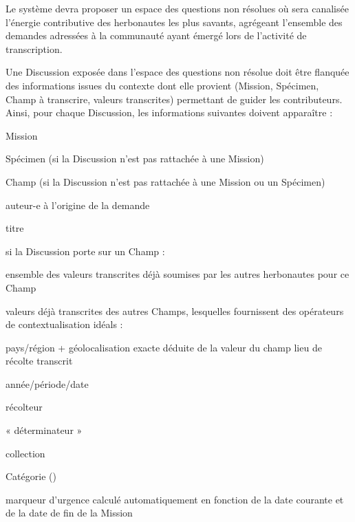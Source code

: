 Le système devra proposer un espace des questions non résolues où sera canalisée l'énergie contributive des herbonautes les plus savants, agrégeant l'ensemble des demandes adressées à la communauté ayant émergé lors de l'activité de transcription.

\startsubsection[title={Contextualisation des Discussions}]

Une Discussion exposée dans l'espace des questions non résolue doit être flanquée des informations issues du contexte dont elle provient (Mission, Spécimen, Champ à transcrire, valeurs transcrites) permettant de guider les contributeurs.
Ainsi, pour chaque Discussion, les informations suivantes doivent apparaître :

\startitemize
\item Mission
\item Spécimen (si la Discussion n'est pas rattachée à une Mission)
\item Champ (si la Discussion n'est pas rattachée à une Mission ou un Spécimen)
\item auteur-e à l'origine de la demande
\item titre
\item si la Discussion porte sur un Champ :
    \startitemize
    \item ensemble des valeurs transcrites déjà soumises par les autres herbonautes pour ce Champ
    \item valeurs déjà transcrites des autres Champs, lesquelles fournissent des opérateurs de contextualisation idéals :
        \startitemize
        \item pays/région + géolocalisation exacte déduite de la valeur du champ lieu de récolte transcrit
        \item année/période/date
        \item récolteur
        \item « déterminateur »
        \item collection
        \stopitemize
    \stopitemize
\item Catégorie ()
\item marqueur d'urgence calculé automatiquement en fonction de la date courante et de la date de fin de la Mission
\stopitemize

\startsubsection[title={Résolution d'une Discussion},reference=disc:resol]

